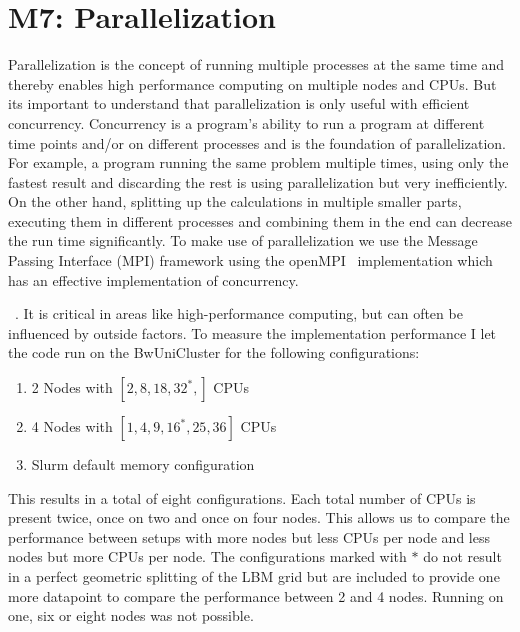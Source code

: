 \documentclass[a4paper,11pt, oneside]{book}
\begin{document}
\section{M7: Parallelization}
Parallelization is the concept of running multiple processes at the same time and thereby enables high performance computing on multiple nodes and CPUs. 
But its important to understand that parallelization is only useful with efficient concurrency. 
Concurrency is a program's ability to run a program at different time points and/or on different processes and is the foundation of parallelization.
For example, a program running the same problem multiple times, using only the fastest result and discarding the rest is using parallelization but very inefficiently.
On the other hand, splitting up the calculations in multiple smaller parts, executing them in different processes and combining them in the end can decrease the run time significantly.
To make use of parallelization we use the Message Passing Interface (MPI) framework using the openMPI~\cite{gabriel04:_open_mpi} implementation which has an effective implementation of concurrency.

~\cite{beyer2019-benchmark}.
It is critical in areas like high-performance computing, but can often be influenced by outside factors.  
To measure the implementation performance I let the code run on the BwUniCluster for the following configurations:
\begin{enumerate}
    \item 2 Nodes with $[2, 8, 18, 32^{*},]$ CPUs
    \item 4 Nodes with $[1, 4, 9, 16^{*}, 25, 36]$ CPUs
    \item Slurm default memory configuration
\end{enumerate}
This results in a total of eight configurations. Each total number of CPUs is present twice, once on two and once on four nodes. 
This allows us to compare the performance between setups with more nodes but less CPUs per node and less nodes but more CPUs per node.
The configurations marked with $*$ do not result in a perfect geometric splitting of the LBM grid but are included to provide one more datapoint to compare the performance between 2 and 4 nodes.
Running on one, six or eight nodes was not possible.
\end{document}
